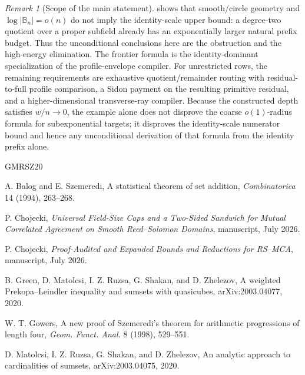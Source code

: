 \documentclass[11pt,a4paper]{amsart}
\numberwithin{equation}{section}
\theoremstyle{remark}
\newtheorem{remark}[theorem]{Remark}
\newcommand{\B}{\mathbb B}
\begin{document}
\begin{remark}[Scope of the main statement]
 shows that smooth/circle geometry and
\(\log|\B_n|=o(n)\) do not imply the identity-scale upper bound: a
degree-two quotient over a proper subfield already has an exponentially
larger natural prefix budget.  Thus the unconditional conclusions here are
the obstruction and the high-energy elimination.  The frontier formula is
the identity-dominant specialization of the profile-envelope compiler.  For
unrestricted rows, the remaining requirements are exhaustive
quotient/remainder routing with residual-to-full profile comparison, a
Sidon payment on the resulting primitive residual, and a
higher-dimensional transverse-ray compiler.
Because the constructed depth satisfies \(w/n\to0\), the example alone
does not disprove the coarse \(o(1)\)-radius formula for subexponential
targets; it disproves the identity-scale numerator bound and hence any
unconditional derivation of that formula from the identity prefix alone.
\end{remark}

\enlargethispage{4\baselineskip}
\begin{thebibliography}{GMRSZ20}

A. Balog and E. Szemeredi,
\newblock A statistical theorem of set addition,
\newblock \emph{Combinatorica} 14 (1994), 263--268.

P. Chojecki,
\newblock \emph{Universal Field-Size Caps and a Two-Sided Sandwich for
Mutual Correlated Agreement on Smooth Reed--Solomon Domains},
\newblock manuscript, July 2026.

P. Chojecki,
\newblock \emph{Proof-Audited and Expanded Bounds and Reductions for
RS--MCA},
\newblock manuscript, July 2026.

B. Green, D. Matolcsi, I. Z. Ruzsa, G. Shakan, and D. Zhelezov,
\newblock A weighted Prekopa--Leindler inequality and sumsets with quasicubes,
\newblock arXiv:2003.04077, 2020.

W. T. Gowers,
\newblock A new proof of Szemeredi's theorem for arithmetic progressions of length four,
\newblock \emph{Geom. Funct. Anal.} 8 (1998), 529--551.

D. Matolcsi, I. Z. Ruzsa, G. Shakan, and D. Zhelezov,
\newblock An analytic approach to cardinalities of sumsets,
\newblock arXiv:2003.04075, 2020.

\end{thebibliography}
\end{document}

